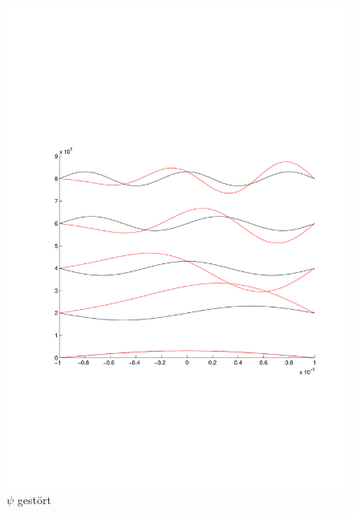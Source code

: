 \begin{refsection}
\begin{figure}
 \centering
 \includegraphics[width=12cm]{efeld/Psi_gestoert.pdf}
 \caption{$\psi$ gest\"ort}
 \label{abb:efeld_psi_gestoert}
\end{figure}


\end{refsection}
